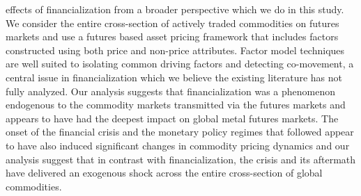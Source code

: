 \documentclass[]{elsarticle} %
\begin{document}
effects of financialization from a broader perspective which we do in
this study. We consider the entire cross-section of actively traded
commodities on futures markets and use a futures based asset pricing
framework that includes factors constructed using both price and
non-price attributes. Factor model techniques are well suited to
isolating common driving factors and detecting co-movement, a central
issue in financialization which we believe the existing literature has
not fully analyzed. Our analysis suggests that financialization was a
phenomenon endogenous to the commodity markets transmitted via the
futures markets and appears to have had the deepest impact on global
metal futures markets. The onset of the financial crisis and the
monetary policy regimes that followed appear to have also induced
significant changes in commodity pricing dynamics and our analysis
suggest that in contrast with financialization, the crisis and its
aftermath have delivered an exogenous shock across the entire
cross-section of global commodities.

\newpage
\begingroup\fontsize{10}{12}\selectfont
\end{document}
